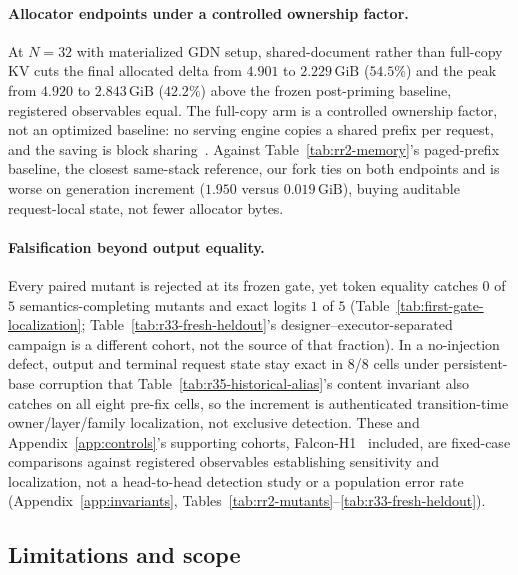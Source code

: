 \documentclass{article}
\newcommand{\gib}{\,\mathrm{GiB}}
\begin{document}
\paragraph{Allocator endpoints under a controlled ownership factor.}
At $N=32$ with materialized GDN setup, shared-document rather than full-copy KV
cuts the final allocated delta from $4.901$ to $2.229\gib$ ($54.5\%$) and the
peak from $4.920$ to $2.843\gib$ ($42.2\%$) above the frozen post-priming
baseline, registered observables equal.  The full-copy arm is a
controlled ownership factor, not an optimized baseline: no serving engine copies
a shared prefix per request, and the saving is block
sharing~\citep{kwon2023pagedattention}. Against
Table~\ref{tab:rr2-memory}'s paged-prefix baseline, the closest same-stack
reference, our fork ties on both endpoints and is worse on generation increment
($1.950$ versus $0.019\gib$), buying auditable request-local state, not fewer
allocator bytes.

\paragraph{Falsification beyond output equality.}
Every paired mutant is rejected at its frozen gate, yet token equality catches
$0$ of $5$ semantics-completing mutants and exact logits $1$ of $5$
(Table~\ref{tab:first-gate-localization}; Table~\ref{tab:r33-fresh-heldout}'s
designer--executor-separated campaign is a different cohort, not the source of
that fraction).  In a no-injection defect, output and terminal request state
stay exact in 8/8 cells under persistent-base corruption that
Table~\ref{tab:r35-historical-alias}'s content invariant also catches on all
eight pre-fix cells, so the increment is authenticated transition-time
owner/layer/family localization, not exclusive detection.  These and
Appendix~\ref{app:controls}'s supporting cohorts,
Falcon-H1~\citep{zuo2025falconh1} included, are fixed-case comparisons against
registered observables establishing sensitivity and localization, not a
head-to-head detection study or a population error rate
(Appendix~\ref{app:invariants},
Tables~\ref{tab:rr2-mutants}--\ref{tab:r33-fresh-heldout}).

\subsection{Limitations and scope}
\label{sec:limitations}
\end{document}
